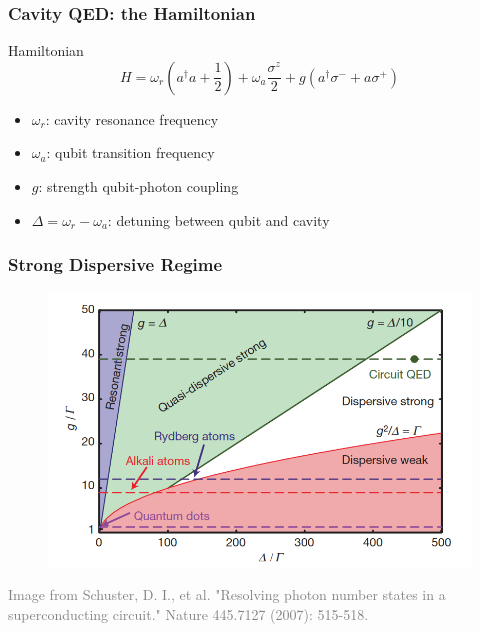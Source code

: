 \documentclass[xcolor=dvipsnames,hyperref={CJKbookmarks=true}]{beamer}
\begin{document}
\begin{frame}
\frametitle{Cavity QED: the Hamiltonian}
\begin{block}{Hamiltonian}
$$H =  \omega_r \left(a^{\dagger} a+ \dfrac{1}{2} \right) +  \omega_a \dfrac{\sigma^{z}}{2}+  g \left(a^{\dagger}\sigma^{-}+a\sigma^{+}\right)$$
\end{block}
\vspace{0.5cm}
\begin{itemize}
\item $\omega_r$: cavity resonance frequency
\vspace{0.3cm}
\item $\omega_a$: qubit transition frequency
\vspace{0.3cm}
\item $g$: strength qubit-photon coupling
\vspace{0.3cm}
\item $\Delta = \omega_r - \omega_a$: detuning between qubit and cavity
\end{itemize}
\end{frame}


\begin{frame}
\frametitle{Strong Dispersive Regime}
\begin{figure}
\centering
\includegraphics[width=.9\textwidth]{Regime}
\end{figure}

\tiny{\textcolor{gray}{Image from Schuster, D. I., et al. "Resolving photon number states in a superconducting circuit." Nature 445.7127 (2007): 515-518.\cite{schuster2007resolving}}}
\end{frame}
\end{document}
